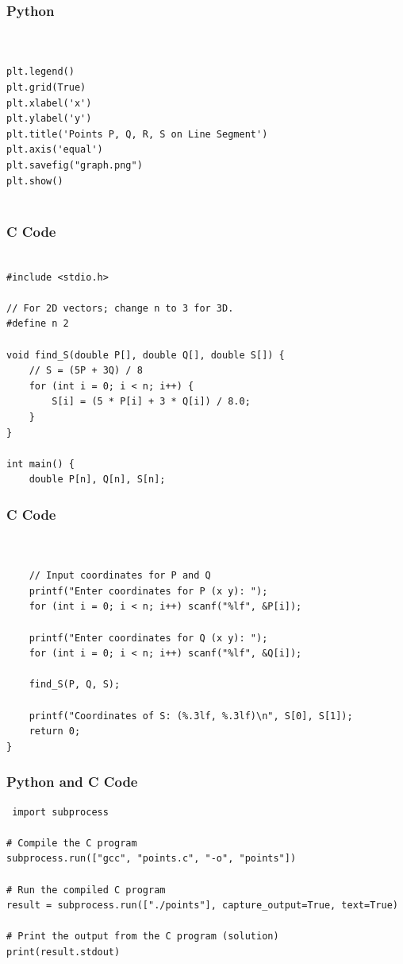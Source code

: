 \documentclass{beamer}
\begin{document}
\begin{frame}[fragile]
    \frametitle{Python}
    \begin{lstlisting}


plt.legend()
plt.grid(True)
plt.xlabel('x')
plt.ylabel('y')
plt.title('Points P, Q, R, S on Line Segment')
plt.axis('equal')
plt.savefig("graph.png") 
plt.show()


\end{lstlisting}
\end{frame}


\begin{frame}[fragile]
\frametitle{C Code}
\begin{lstlisting}
  
#include <stdio.h>

// For 2D vectors; change n to 3 for 3D.
#define n 2

void find_S(double P[], double Q[], double S[]) {
    // S = (5P + 3Q) / 8
    for (int i = 0; i < n; i++) {
        S[i] = (5 * P[i] + 3 * Q[i]) / 8.0;
    }
}

int main() {
    double P[n], Q[n], S[n];

 \end{lstlisting}
\end{frame} 


\begin{frame}[fragile]
\frametitle{C Code}
\begin{lstlisting}
    
    
    // Input coordinates for P and Q
    printf("Enter coordinates for P (x y): ");
    for (int i = 0; i < n; i++) scanf("%lf", &P[i]);

    printf("Enter coordinates for Q (x y): ");
    for (int i = 0; i < n; i++) scanf("%lf", &Q[i]);

    find_S(P, Q, S);

    printf("Coordinates of S: (%.3lf, %.3lf)\n", S[0], S[1]);
    return 0;
}

\end{lstlisting}
\end{frame}

\begin{frame}[fragile]
\frametitle{Python and C Code}

\begin{lstlisting}
 import subprocess

# Compile the C program
subprocess.run(["gcc", "points.c", "-o", "points"])

# Run the compiled C program
result = subprocess.run(["./points"], capture_output=True, text=True)

# Print the output from the C program (solution)
print(result.stdout) 

\end{lstlisting}
\end{frame}
\end{document}
